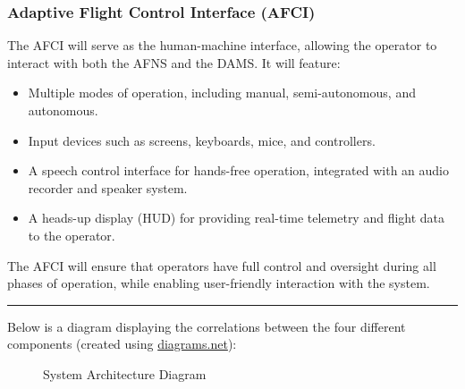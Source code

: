 \documentclass[12pt]{article}
\begin{document}
\subsubsection{Adaptive Flight Control Interface (AFCI)}
The AFCI will serve as the human-machine interface, allowing the operator to interact with both the AFNS and the DAMS. It will feature:
\begin{itemize}
    \item Multiple modes of operation, including manual, semi-autonomous, and autonomous.
    \item Input devices such as screens, keyboards, mice, and controllers.
    \item A speech control interface for hands-free operation, integrated with an audio recorder and speaker system.
    \item A heads-up display (HUD) for providing real-time telemetry and flight data to the operator.
\end{itemize}
The AFCI will ensure that operators have full control and oversight during all phases of operation, while enabling user-friendly interaction with the system.

\noindent\rule{\textwidth}{0.4pt}

Below is a diagram displaying the correlations between the four different components (created using \href{https://www.diagrams.net/}{diagrams.net}):

\begin{figure}[h]
    \centering
    \caption{System Architecture Diagram}
\end{figure}
\end{document}
